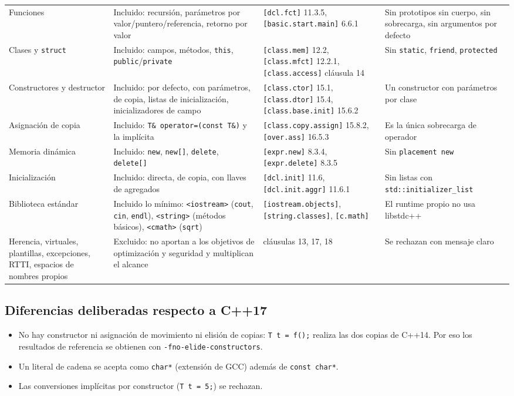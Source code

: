 \documentclass[11pt,a4paper]{article}
\newcommand{\cod}[1]{\texttt{#1}}
\begin{document}
{\begin{longtable}{p{2.6cm}p{4.3cm}p{4.4cm}p{3.4cm}}
Funciones & Incluido: recursión, parámetros por valor/puntero/referencia, retorno por valor & \cod{[dcl.fct]} 11.3.5, \cod{[basic.start.main]} 6.6.1 & Sin prototipos sin cuerpo, sin sobrecarga, sin argumentos por defecto \\
Clases y \cod{struct} & Incluido: campos, métodos, \cod{this}, \cod{public}/\cod{private} & \cod{[class.mem]} 12.2, \cod{[class.mfct]} 12.2.1, \cod{[class.access]} cláusula 14 & Sin \cod{static}, \cod{friend}, \cod{protected} \\
Constructores y destructor & Incluido: por defecto, con parámetros, de copia, listas de inicialización, inicializadores de campo & \cod{[class.ctor]} 15.1, \cod{[class.dtor]} 15.4, \cod{[class.base.init]} 15.6.2 & Un constructor con parámetros por clase \\
Asignación de copia & Incluido: \cod{T\& operator=(const T\&)} y la implícita & \cod{[class.copy.assign]} 15.8.2, \cod{[over.ass]} 16.5.3 & Es la única sobrecarga de operador \\
Memoria dinámica & Incluido: \cod{new}, \cod{new[]}, \cod{delete}, \cod{delete[]} & \cod{[expr.new]} 8.3.4, \cod{[expr.delete]} 8.3.5 & Sin \cod{placement new} \\
Inicialización & Incluido: directa, de copia, con llaves de agregados & \cod{[dcl.init]} 11.6, \cod{[dcl.init.aggr]} 11.6.1 & Sin listas con \cod{std::initializer\_list} \\
Biblioteca estándar & Incluido lo mínimo: \cod{<iostream>} (\cod{cout}, \cod{cin}, \cod{endl}), \cod{<string>} (métodos básicos), \cod{<cmath>} (\cod{sqrt}) & \cod{[iostream.objects]}, \cod{[string.classes]}, \cod{[c.math]} & El runtime propio no usa libstdc++ \\
Herencia, virtuales, plantillas, excepciones, RTTI, espacios de nombres propios & Excluido: no aportan a los objetivos de optimización y seguridad y multiplican el alcance & cláusulas 13, 17, 18 & Se rechazan con mensaje claro \\
\bottomrule
\end{longtable}
}

\subsection{Diferencias deliberadas respecto a C++17}
\begin{itemize}
  \item No hay constructor ni asignación de movimiento ni elisión de copias: \cod{T t = f();} realiza las dos
        copias de C++14. Por eso los resultados de referencia se obtienen con \cod{-fno-elide-constructors}.
  \item Un literal de cadena se acepta como \cod{char*} (extensión de GCC) además de \cod{const char*}.
  \item Las conversiones implícitas por constructor (\cod{T t = 5;}) se rechazan.
\end{itemize}
\end{document}
